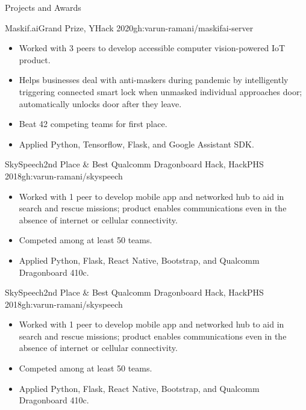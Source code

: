 \documentclass[]{mcdowellcv}
\begin{document}
	\makeheader
	
	\begin{cvsection}{Projects and Awards}
		\begin{cvsubsection}{Maskif.ai}{Grand Prize, YHack 2020}{gh:varun-ramani/maskifai-server}
			\begin{itemize}
				\item Worked with 3 peers to develop accessible computer vision-powered IoT product.
				\item Helps businesses deal with anti-maskers during pandemic by intelligently 
				triggering connected smart lock when unmasked individual approaches door; 
				automatically unlocks door after they leave.
				\item Beat 42 competing teams for first place.
				\item Applied Python, Tensorflow, Flask, and Google Assistant SDK. 
			\end{itemize}
		\end{cvsubsection}
		\begin{cvsubsection}{SkySpeech}{2nd Place \& Best Qualcomm Dragonboard Hack, HackPHS 2018}{gh:varun-ramani/skyspeech}
			\vspace{1em}
			\begin{itemize}
				\item Worked with 1 peer to develop mobile app and networked hub to aid in search and rescue missions; 
				product enables communications even in the absence of internet or cellular connectivity.
				\item Competed among at least 50 teams.
				\item Applied Python, Flask, React Native, Bootstrap, and Qualcomm Dragonboard 410c.
			\end{itemize}
		\end{cvsubsection}
		\begin{cvsubsection}{SkySpeech}{2nd Place \& Best Qualcomm Dragonboard Hack, HackPHS 2018}{gh:varun-ramani/skyspeech}
			\vspace{1em}
			\begin{itemize}
				\item Worked with 1 peer to develop mobile app and networked hub to aid in search and rescue missions; 
				product enables communications even in the absence of internet or cellular connectivity.
				\item Competed among at least 50 teams.
				\item Applied Python, Flask, React Native, Bootstrap, and Qualcomm Dragonboard 410c.
			\end{itemize}
		\end{cvsubsection}
	\end{cvsection}
\end{document}
